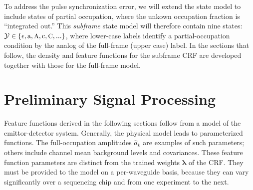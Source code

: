\documentclass[10pt]{article}
\newcommand{\ie}{\emph{i.e.}}
\newcommand{\dws}{{\small DWS}}
\newcommand{\crf}{{\small CRF}}
\newcommand{\fA}{\ensuremath{\text{\small{A}}}}
\newcommand{\fC}{\ensuremath{\text{\small{C}}}}
\newcommand{\pA}{\ensuremath{\text{a}}}
\newcommand{\pC}{\ensuremath{\text{c}}}
\newcommand{\pG}{\ensuremath{\text{g}}}
\newcommand{\pT}{\ensuremath{\text{t}}}
\begin{document}
To address the pulse synchronization error, we will extend the state model to include states of partial occupation,
where the unkown occupation fraction is ``integrated out.''  This \emph{subframe} state model will therefore contain nine states:  $\mathcal{Y} \in \{\epsilon, \pA, \fA, \pC, \fC,...\}$, where lower-case labels identify a partial-occupation condition by the analog of the full-frame (upper case) label.  In the sections that follow, the density and feature functions for the subframe \crf{} are developed together with those for the full-frame model.



\section{Preliminary Signal Processing}
\label{sec:signal_processing}
Feature functions derived in the following sections follow from a model of the emittor-detector system.  Generally, the physical model leads to parameterized functions.  The full-occupation amplitudes $\hat{a}_k$ are examples of such parameters; others include channel mean background levels and covariances.  These feature function parameters are distinct from the trained weights $\mathbf{\lambda}$ of the \crf{}.  They must be provided to the model on a per-waveguide basis, because they can vary significantly over a sequencing chip and from one experiment to the next.
\end{document}

